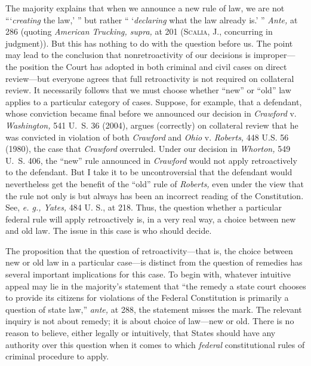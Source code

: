 {  The majority explains that when we announce a new rule of law, we are not ``‘\emph{creating} the law,' '' but rather `` ‘\emph{declaring} what the law already is.' '' \emph{Ante,} at 286 (quoting \emph{American Trucking, supra,} at 201 (\textsc{Scalia,} J., concurring in judgment)). But this has nothing to do with the question before us. The point may lead to the conclusion that nonretroactivity of our decisions is improper---the position the Court has adopted in both criminal and civil cases on direct review---but everyone agrees that full retroactivity is not required on collateral review. It necessarily follows that we must choose whether ``new'' or ``old'' law applies to a particular category of cases. Suppose, for example, that a defendant, whose conviction became final before we announced our decision in \emph{Crawford} v. \emph{Washington,} 541 U.~S. 36 (2004), argues (correctly) on collateral review that he was convicted in violation of both \emph{Crawford} and \emph{Ohio} v. \emph{Roberts,} 448 U.S. 56 (1980), the case that \emph{Crawford} overruled. Under our decision in \emph{Whorton,} 549 U.~S. 406, the ``new'' rule announced in \newpage \emph{Crawford} would not apply retroactively to the defendant. But I take it to be uncontroversial that the defendant would nevertheless get the benefit of the ``old'' rule of \emph{Roberts,} even under the view that the rule not only is but always has been an incorrect reading of the Constitution. See, \emph{e. g., Yates,} 484 U. S., at 218. Thus, the question whether a particular federal rule will apply retroactively is, in a very real way, a choice between new and old law. The issue in this case is who should decide.

  The proposition that the question of retroactivity---that is, the choice between new or old law in a particular case---is distinct from the question of remedies has several important implications for this case. To begin with, whatever intuitive appeal may lie in the majority's statement that ``the remedy a state court chooses to provide its citizens for violations of the Federal Constitution is primarily a question of state law,'' \emph{ante,} at 288, the statement misses the mark. The relevant inquiry is not about remedy; it is about choice of law---new or old. There is no reason to believe, either legally or intuitively, that States should have any authority over this question when it comes to which \emph{federal} constitutional rules of criminal procedure to apply.\footnotemark[3]

}
